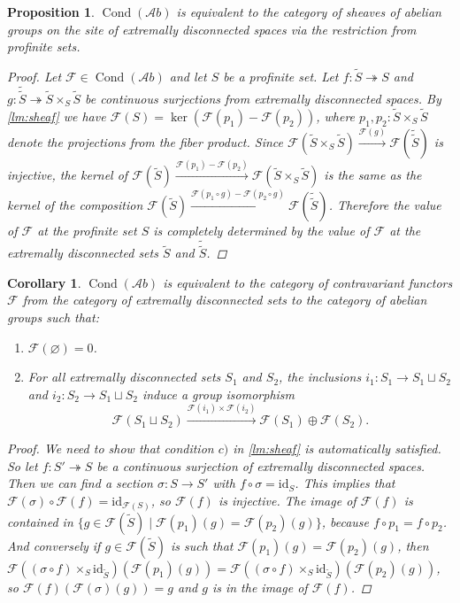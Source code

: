 \documentclass[11pt,A4]{article}
\theoremstyle{plain}
\newtheorem{prop}[thm]{Proposition}
\newtheorem{cor}[thm]{Corollary}
\theoremstyle{definition}
\theoremstyle{remark}
\newcommand{\1}{\mathbbm{1}}
\newcommand{\F}{\mathcal{F}}
\newcommand{\Ab}{\mathscr{A}b}
\DeclareMathOperator{\Cond}{Cond}
\newcommand{\op}{\oplus}
\newcommand{\fp}[1]{\times_{#1}}
\newcommand{\id}{\mathrm{id}}
\begin{document}
\begin{prop}
    $\Cond(\Ab)$ is equivalent to the category of sheaves of abelian groups on the site of extremally disconnected spaces via the restriction from profinite sets.
    \begin{proof}
	Let $\F\in \Cond(\Ab)$ and let $S$ be a profinite set.
	Let $f\colon \tilde{S}\twoheadrightarrow S$ and $g\colon \tilde{\tilde{S}}\twoheadrightarrow \tilde{S}\fp{S}\tilde{S}$ be continuous surjections from extremally disconnected spaces.
	By \cref{lm:sheaf} we have $\F(S)=\ker(\F(p_{1})-\F(p_{2}))$, where $p_{1},p_{2}\colon \tilde{S}\fp{S}\tilde{S}$ denote the projections from the fiber product.
	Since $\F(\tilde{S}\fp{S}\tilde{S})\xrightarrow{\F(g)} \F(\tilde{\tilde{S}})$ is injective, the kernel of $\F(\tilde{S})\xrightarrow{\F(p_{1})-\F(p_{2})} \F(\tilde{S}\fp{S}\tilde{S})$ is the same as the kernel of the composition $\F(\tilde{S})\xrightarrow{\F(p_{1}\circ g)-\F(p_{2}\circ g)} \F(\tilde{\tilde{S}})$.
	Therefore the value of $\F$ at the profinite set $S$ is completely determined by the value of $\F$ at the extremally disconnected sets $\tilde{S}$ and $\tilde{\tilde{S}}$.
    \end{proof}
\end{prop}

\begin{cor}\label{cor:sheaf}
    $\Cond(\Ab)$ is equivalent to the category of contravariant functors $\F$ from the category of extremally disconnected sets to the category of abelian groups such that:
    \begin{enumerate}[label=\alph*)]
	\item $\F(\varnothing)=0$.
	\item For all extremally disconnected sets $S_{1}$ and $S_{2}$, the inclusions $i_{1}\colon S_{1}\to S_{1}\sqcup S_{2}$ and $i_{2}\colon S_{2}\to S_{1}\sqcup S_{2}$ induce a group isomorphism
	    \[ \F(S_{1}\sqcup S_{2})\xrightarrow{\F(i_{1})\times \F(i_{2})} \F(S_{1})\op \F(S_{2}).\]
    \end{enumerate}
    \begin{proof}
	We need to show that condition $c)$ in \cref{lm:sheaf} is automatically satisfied.
	So let $f\colon S'\twoheadrightarrow S$ be a continuous surjection of extremally disconnected spaces.
	Then we can find a section $\sigma\colon S\to S'$ with $f\circ \sigma =\id_{S}$.
	This implies that $\F(\sigma)\circ \F(f)=\id_{\F(S)}$, so $\F(f)$ is injective.
	The image of $\F(f)$ is contained in $\{ g\in \F(\tilde{S})\mid \F(p_{1})(g)=\F(p_{2})(g)\}$, because $f\circ p_{1}=f\circ p_{2}$.
	And conversely if $g\in \F(\tilde{S})$ is such that $\F(p_{1})(g)=\F(p_{2})(g)$, then $\F((\sigma \circ f)\fp{S}\id_{\tilde{S}})(\F(p_{1})(g))=\F((\sigma \circ f)\fp{S}\id_{\tilde{S}})(\F(p_{2})(g))$, so $\F(f)(\F(\sigma)(g))=g$ and $g$ is in the image of $\F(f)$.
    \end{proof}
\end{cor}
\end{document}
